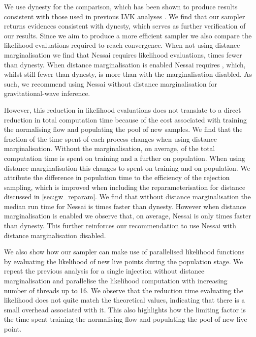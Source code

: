 \documentclass[%
 reprint,
nofootinbib,
 amsmath,amssymb,
 aps,
 prd,
]{revtex4-2}
\newcommand{\nessai}{{\sc Nessai}\xspace}
\newcommand{\dynesty}{{\sc dynesty}\xspace}
\begin{document}
We use \dynesty for the comparison, which has been shown to produce results consistent with those used in previous LVK analyses \cite{Romero-Shaw:2020}. We find that our sampler returns evidences consistent with \dynesty, which serves as further verification of our results. Since we aim to produce a more efficient sampler we also compare the likelihood evaluations required to reach convergence. When not using distance marginalisation we find that \nessai requires \nessaievaluations likelihood evaluations, \evaluationsratio times fewer than \dynesty. When distance marginalisation is enabled \nessai requires \nessaievaluationsmarg, which, whilst still \evaluationsratiomarg fewer than \dynesty, is more than with the marginalisation disabled. As such, we recommend using \nessai without distance marginalisation for gravitational-wave inference.

However, this reduction in likelihood evaluations does not translate to a direct reduction in total computation time because of the cost associated with training the normalising flow and populating the pool of new samples. We find that the fraction of the time spent of each process changes when using distance marginalisation. Without the marginalisation, on average, \trainingtime of the total computation time is spent on training and a further \populationtime on population. When using distance marginalisation this changes to \trainingtimemarg spent on training and \populationtimemarg on population. We attribute the difference in population time to the efficiency of the rejection sampling, which is improved when including the reparameterisation for distance discussed in \cref{sec:gw_reparam}. We find that without distance marginalisation the median run time for \nessai is \timeratio times faster than \dynesty. However when distance marginalisation is enabled we observe that, on average, \nessai is only \timeratiomarg times faster than \dynesty. This further reinforces our recommendation to use \nessai with distance marginalisation disabled.

We also show how our sampler can make use of parallelised likelihood functions by evaluating the likelihood of new live points during the population stage. We repeat the previous analysis for a single injection without distance marginalisation and parallelise the likelihood computation with increasing number of threads up to 16. We observe that the reduction time evaluating the likelihood does not quite match the theoretical values, indicating that there is a small overhead associated with it. This also highlights how the limiting factor is the time spent training the normalising flow and populating the pool of new live point.
\end{document}
